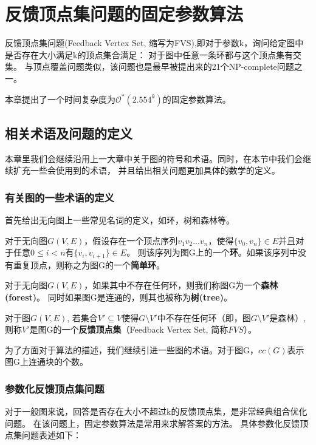\chapter{反馈顶点集问题的固定参数算法}
反馈顶点集问题(Feedback Vertex Set, 缩写为FVS),即对于参数k，询问给定图中是否存在大小满足k的顶点集合满足：
对于图中任意一条环都与这个顶点集有交集。
与顶点覆盖问题类似，该问题也是最早被提出来的21个NP-complete问题之一\cite{karp1972reducibility}。

本章提出了一个时间复杂度为$\mathcal{O}^*(2.554^k)$的固定参数算法。
\section{相关术语及问题的定义}

本章里我们会继续沿用上一大章中关于图的符号和术语。同时，在本节中我们会继续扩充一些会使用到的术语，
并且给出相关问题更加具体的数学的定义。
\subsection{有关图的一些术语的定义}
首先给出无向图上一些常见名词的定义，如环，树和森林等。
\begin{definition}[环]
对于无向图$G(V,E)$，假设存在一个顶点序列$v_1v_2...v_n$，使得$\{v_0, v_n\} \in E$并且对于任意$0 \le i < n$有$\{v_i, v_{i+1}\} \in E$。
则该序列为图G上的一个\textbf{环}。如果该序列中没有重复顶点，则称之为图G的一个\textbf{简单环}。
\end{definition}

\begin{definition}
对于无向图$G(V,E)$，如果其中不存在任何环，则我们称图G为一个\textbf{森林(forest)}。
同时如果图G是连通的，则其也被称为\textbf{树(tree)}。
\end{definition}

\begin{definition}[反馈顶点集]
对于图$G(V, E)$, 若集合$V' \subseteq V$使得$G \setminus V'$中不存在任何环（即，图$G \setminus V'$是森林）,
则称$V'$是图G的一个\textbf{反馈顶点集}（Feedback Vertex Set, 简称$FVS$）。
\end{definition}

为了方面对于算法的描述，我们继续引进一些图的术语。对于图G，$cc(G)$表示图G上连通块的个数。

\subsection{参数化反馈顶点集问题}
对于一般图来说，回答是否存在大小不超过k的反馈顶点集，是非常经典组合优化问题。
在该问题上，固定参数算法是常用来求解答案的方法。
具体参数化反馈顶点集问题表述如下：\\

